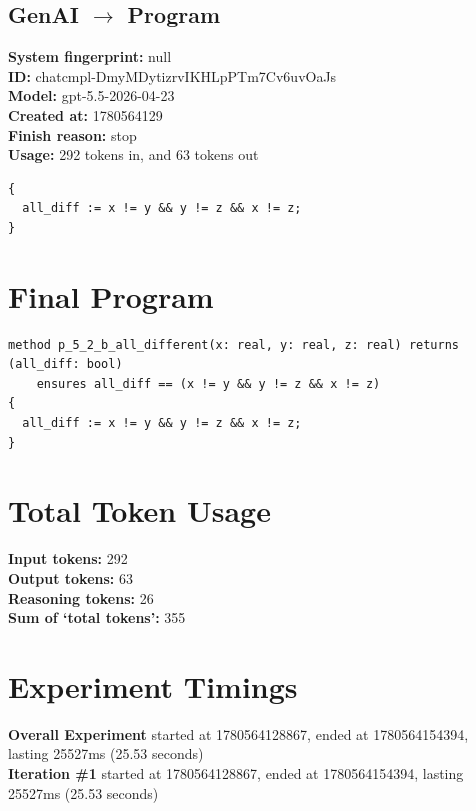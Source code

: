 \documentclass{article}
\begin{document}
\subsection*{GenAI $\rightarrow$ Program}
\textbf{System fingerprint: }null
\\\textbf{ID: }chatcmpl-DmyMDytizrvIKHLpPTm7Cv6uvOaJs
\\\textbf{Model: }gpt-5.5-2026-04-23
\\\textbf{Created at: }1780564129
\\\textbf{Finish reason: }stop
\\\textbf{Usage: }292 tokens in, and 63 tokens out
\begin{lstlisting}
{
  all_diff := x != y && y != z && x != z;
}
\end{lstlisting}
\section*{Final Program}
\begin{lstlisting}
method p_5_2_b_all_different(x: real, y: real, z: real) returns (all_diff: bool)
	ensures all_diff == (x != y && y != z && x != z)
{
  all_diff := x != y && y != z && x != z;
}
\end{lstlisting}
\section*{Total Token Usage}
\textbf{Input tokens: }292
\\\textbf{Output tokens: }63
\\\textbf{Reasoning tokens: }26
\\\textbf{Sum of `total tokens': }355
\section*{Experiment Timings}
\textbf{Overall Experiment} started at 1780564128867, ended at 1780564154394, lasting 25527ms (25.53 seconds)
\\\textbf{Iteration \#1} started at 1780564128867, ended at 1780564154394, lasting 25527ms (25.53 seconds)
\end{document}
